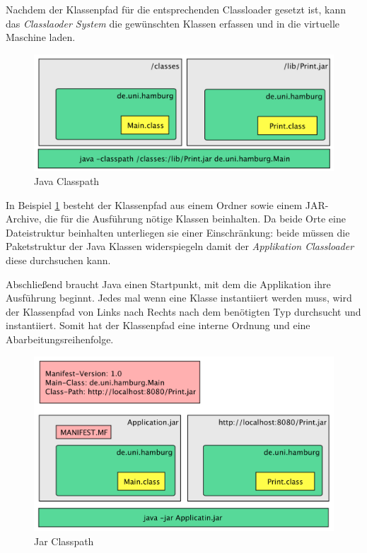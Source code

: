   Nachdem der Klassenpfad für die entsprechenden Classloader gesetzt ist, kann das \textit{Classlaoder System} die gewünschten Klassen erfassen und in die virtuelle Maschine laden.

  \begin{figure}[h]
    \includegraphics[width=\textwidth]{material/images/Classpath.png}
    \caption{Java Classpath}
    \label{fig:Classpath-Simple}
  \end{figure}

  In Beispiel \ref{fig:Classpath-Simple} besteht der Klassenpfad aus einem Ordner sowie einem JAR-Archive, die für die Ausführung nötige Klassen beinhalten. Da beide Orte eine Dateistruktur beinhalten unterliegen sie einer Einschränkung: beide müssen die Paketstruktur der Java Klassen widerspiegeln damit der \textit{Applikation Classloader} diese durchsuchen kann. 

  Abschließend braucht Java einen Startpunkt, mit dem die Applikation ihre Ausführung beginnt. Jedes mal wenn eine Klasse instantiiert werden muss, wird der Klassenpfad von Links nach Rechts nach dem benötigten Typ durchsucht und instantiiert. Somit hat der Klassenpfad eine interne Ordnung und eine Abarbeitungsreihenfolge.
  \begin{figure}[h]
    \includegraphics[width=\textwidth]{material/images/Classpath-Manifest.png}
    \caption{Jar Classpath}
    \label{fig:Classpath-Advanced}
  \end{figure}

